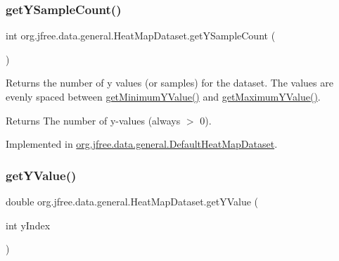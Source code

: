 \mbox{\label{interfaceorg_1_1jfree_1_1data_1_1general_1_1_heat_map_dataset_adc230b763b1adc1b0af0210cc68760c6}} 
\subsubsection{\texorpdfstring{get\+Y\+Sample\+Count()}{getYSampleCount()}}
{\footnotesize\ttfamily int org.\+jfree.\+data.\+general.\+Heat\+Map\+Dataset.\+get\+Y\+Sample\+Count (\begin{DoxyParamCaption}{ }\end{DoxyParamCaption})}

Returns the number of y values (or samples) for the dataset. The values are evenly spaced between \mbox{\hyperlink{interfaceorg_1_1jfree_1_1data_1_1general_1_1_heat_map_dataset_ad3b85b7cbe6b7bb308701f5a58613903}{get\+Minimum\+Y\+Value()}} and \mbox{\hyperlink{interfaceorg_1_1jfree_1_1data_1_1general_1_1_heat_map_dataset_a263e6f91dd132e3c82bb71902f37e73c}{get\+Maximum\+Y\+Value()}}.

\begin{DoxyReturn}{Returns}
The number of y-\/values (always $>$ 0). 
\end{DoxyReturn}


Implemented in \mbox{\hyperlink{classorg_1_1jfree_1_1data_1_1general_1_1_default_heat_map_dataset_af67f4dae36d4757ab83623dbd3811501}{org.\+jfree.\+data.\+general.\+Default\+Heat\+Map\+Dataset}}.

\mbox{\label{interfaceorg_1_1jfree_1_1data_1_1general_1_1_heat_map_dataset_a688282ee25f73c73ac1b0686bfbbe88f}} 
\subsubsection{\texorpdfstring{get\+Y\+Value()}{getYValue()}}
{\footnotesize\ttfamily double org.\+jfree.\+data.\+general.\+Heat\+Map\+Dataset.\+get\+Y\+Value (\begin{DoxyParamCaption}\item[{int}]{y\+Index }\end{DoxyParamCaption})}

